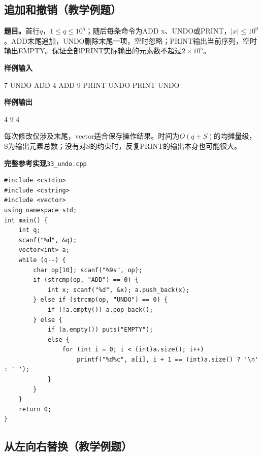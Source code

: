 \documentclass[UTF8,11pt,a4paper,fontset=none]{ctexart}
\begin{document}
\subsection{追加和撤销（教学例题）}

\noindent\textbf{题目。}首行$q$，$1\le q\le10^5$；随后每条命令为ADD x、UNDO或PRINT，$|x|\le10^9$。ADD末尾追加，UNDO删除末尾一项，空时忽略；PRINT输出当前序列，空时输出EMPTY。保证全部PRINT实际输出的元素数不超过$2\times10^5$。
\begin{tcolorbox}[samplebox,title={输入输出样例}]
\textbf{样例输入}
\begin{Sample}
7
UNDO
ADD 4
ADD 9
PRINT
UNDO
PRINT
UNDO
\end{Sample}
\tcblower
\textbf{样例输出}
\begin{Sample}
4 9
4
\end{Sample}
\end{tcolorbox}
每次修改仅涉及末尾，vector适合保存操作结果。时间为$O(q+S)$的均摊量级，S为输出元素总数；没有对S的约束时，反复PRINT的输出本身也可能很大。
\par\noindent\begin{minipage}{\linewidth}
\textbf{完整参考实现}\quad\texttt{33\_undo.cpp}
\begin{lstlisting}
#include <cstdio>
#include <cstring>
#include <vector>
using namespace std;
int main() {
    int q;
    scanf("%d", &q);
    vector<int> a;
    while (q--) {
        char op[10]; scanf("%9s", op);
        if (strcmp(op, "ADD") == 0) {
            int x; scanf("%d", &x); a.push_back(x);
        } else if (strcmp(op, "UNDO") == 0) {
            if (!a.empty()) a.pop_back();
        } else {
            if (a.empty()) puts("EMPTY");
            else {
                for (int i = 0; i < (int)a.size(); i++)
                    printf("%d%c", a[i], i + 1 == (int)a.size() ? '\n' : ' ');
            }
        }
    }
    return 0;
}
\end{lstlisting}
\end{minipage}\par

\subsection{从左向右替换（教学例题）}
\end{document}
